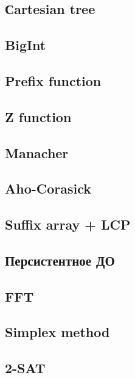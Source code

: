 \documentclass[10pt]{article}
\begin{document}
\begin{multicols}{2}
\subsection{Сartesian tree}

\subsection{BigInt}

\subsection{Prefix function}

\subsection{Z function}

\subsection{Manacher}

\subsection{Aho-Corasick}

\subsection{Suffix array + LCP}

\subsection{Персистентное ДО}

\subsection{FFT}

\subsection{Simplex method}

\subsection{2-SAT}

\end{multicols}
\newpage
\end{document}
